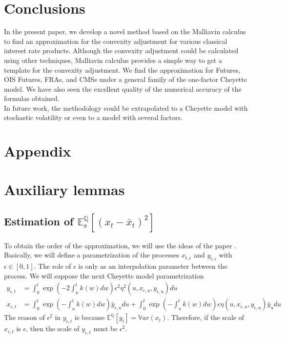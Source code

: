 \documentclass[a4paper,10pt]{article}
\newcommand{\1}{\mathbf{1}}
\begin{document}
\section{Conclusions}\label{sec:Conclusion}
In the present paper, we develop a novel method based on the Malliavin calculus to find an approximation for the convexity adjustment for various classical interest rate products. Although the convexity adjustment could be calculated using other techniques, Malliavin calculus provides a simple way to get a template for the convexity adjustment. We find the approximation for Futures, OIS Futures, FRAs, and CMSs under a general family of the one-factor Cheyette model. We have also seen the excellent quality of the numerical accuracy of the formulas obtained.\\

In future work, the methodology could be extrapolated to a Cheyette model with stochastic volatility or even to a model with several factors.


\section*{Appendix}
\appendix
\renewcommand{\thesection}{\Alph{section}.\arabic{section}}




\section{Auxiliary lemmas}
\subsection{Estimation of $\mathbb{E}_s^{\mathbb{Q}}\left[(x_t - \bar{x}_{t})^{2}\right]$}\label{estimation_error_l2}
To obtain the order of the approximation, we will use the ideas of the paper \cite{BGM}. Basically, we will define a parametrization of the processes $x_{t,\epsilon}$ and $y_{t,\epsilon}$ with $\epsilon \in [0,1]$. The role of $\epsilon$ is only as an interpolation parameter between the process. We will suppose the next Cheyette model parametrization
\begin{align}\label{parametric_process}
y_{\epsilon,t} &= \int_{0}^{t} \exp\left(-2 \int_{u}^{t} k(w) dw\right) \epsilon^{2} \eta^{2}(u,x_{\epsilon,u},y_{\epsilon,u}) du \\
x_{\epsilon, t} &= \int_{0}^{t} \exp\left(-\int_{u}^{t} k(w) dw\right) \bar{y}_{\epsilon,u} du + \int_{0}^{t} \exp\left(-\int_{u}^{t} k(w) dw\right) \epsilon \eta(u,x_{\epsilon,u},y_{\epsilon,u})  \bar{y}_u du
\end{align}
The reason of $\epsilon^{2}$ in $y_{\epsilon,t}$ is because $\mathbb{E}^{\mathbb{Q}}\left[y_t\right]= \mathbb{V}ar(x_t)$. Therefore, if the scale of $x_{\epsilon,t}$ is $\epsilon$, then the scale of $y_{\epsilon,t}$ must be $\epsilon^{2}$.\\
\end{document}
